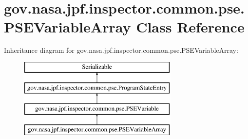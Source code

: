 \hypertarget{classgov_1_1nasa_1_1jpf_1_1inspector_1_1common_1_1pse_1_1_p_s_e_variable_array}{}\section{gov.\+nasa.\+jpf.\+inspector.\+common.\+pse.\+P\+S\+E\+Variable\+Array Class Reference}
\label{classgov_1_1nasa_1_1jpf_1_1inspector_1_1common_1_1pse_1_1_p_s_e_variable_array}
Inheritance diagram for gov.\+nasa.\+jpf.\+inspector.\+common.\+pse.\+P\+S\+E\+Variable\+Array\+:\begin{figure}[H]
\begin{center}
\leavevmode
\includegraphics[height=4.000000cm]{classgov_1_1nasa_1_1jpf_1_1inspector_1_1common_1_1pse_1_1_p_s_e_variable_array}
\end{center}
\end{figure}
